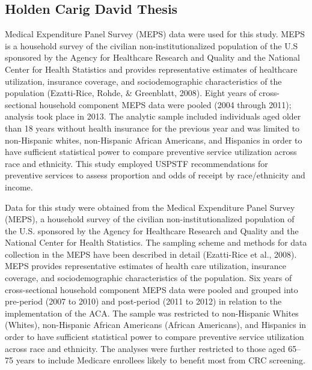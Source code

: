 \documentclass[../main.tex]{subfiles}
\begin{document}
\subsection{Holden Carig David Thesis}
Medical Expenditure Panel Survey (MEPS) data were used for this study. MEPS is a household survey of the civilian non-institutionalized population of the U.S sponsored by the Agency for Healthcare Research and Quality and the National Center for Health Statistics and provides representative estimates of healthcare utilization, insurance coverage, and sociodemographic characteristics of the population (Ezatti-Rice, Rohde, \& Greenblatt, 2008). Eight years of cross-sectional household component MEPS data were pooled (2004 through 2011); analysis took place in 2013. The analytic sample included individuals aged older than 18 years without health insurance for the previous year and was limited to non-Hispanic whites, non-Hispanic African Americans, and Hispanics in order to have sufficient statistical power to compare preventive service utilization across race and ethnicity. This study employed USPSTF recommendations for preventive services to assess proportion and odds of receipt by race/ethnicity and income.

Data for this study were obtained from the Medical Expenditure Panel Survey (MEPS), a household survey of the civilian non-institutionalized population of the U.S. sponsored by the Agency for Healthcare Research and Quality and the National Center for Health Statistics. The sampling scheme and methods for data collection in the MEPS have been described in detail (Ezatti-Rice et al., 2008). MEPS provides representative estimates of health care utilization, insurance coverage, and sociodemographic characteristics of the population. Six years of cross-sectional household component MEPS data were pooled and grouped into pre-period (2007 to 2010) and post-period (2011 to 2012) in relation to the implementation of the ACA. The sample was restricted to non-Hispanic Whites (Whites), non-Hispanic African Americans (African Americans), and Hispanics in order to have sufficient statistical power to compare preventive service utilization across race and ethnicity. The analyses were further restricted to those aged 65–75 years to include Medicare enrollees likely to benefıt most from CRC screening.
\end{document}
